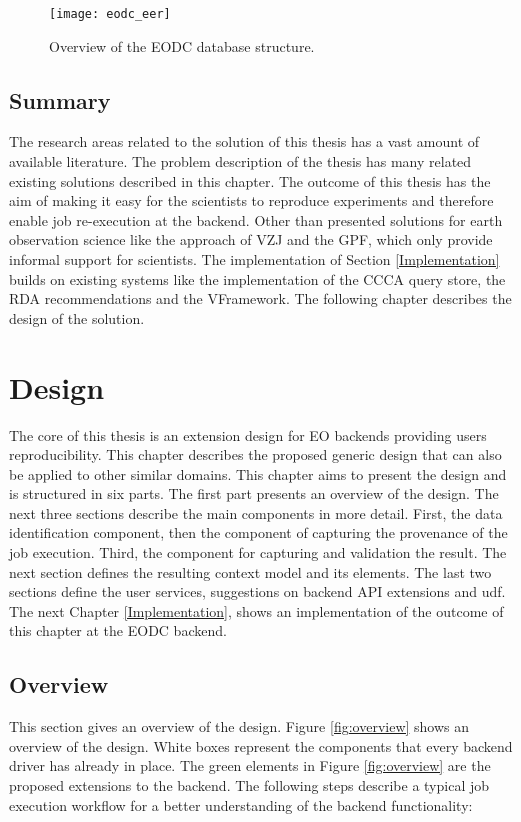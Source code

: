 \documentclass[draft,final]{vutinfth} %
\begin{document}
\begin{figure}[h]
	\centering
	\texttt{[image: eodc\_eer]}
	\caption{Overview of the EODC database structure.}
	\label{fig:eodceer} %
\end{figure}
\newpage
\section{Summary}

The research areas related to the solution of this thesis has a vast amount of available literature. The problem description of the thesis has many related existing solutions described in this chapter. The outcome of this thesis has the aim of making it easy for the scientists to reproduce experiments and therefore enable job re-execution at the backend. Other than presented solutions for earth observation science like the approach of VZJ and the GPF, which only provide informal support for scientists. The implementation of Section \ref{Implementation} builds on existing systems like the implementation of the CCCA query store, the RDA recommendations and the VFramework. The following chapter describes the design of the solution. 
 
\chapter{Design}\label{Design}


The core of this thesis is an extension design for EO backends providing users reproducibility. This chapter describes the proposed generic design that can also be applied to other similar domains. This chapter aims to present the design and is structured in six parts. The first part presents an overview of the design. The next three sections describe the main components in more detail. First,  the data identification component, then the component of capturing the provenance of the job execution. Third, the component for capturing and validation the result. The next section defines the resulting context model and its elements. The last two sections define the user services, suggestions on backend API extensions and \gls{udf}. The next Chapter \ref{Implementation}, shows an implementation of the outcome of this chapter at the EODC backend. 

\section{Overview}\label{Design:Overview}
This section gives an overview of the design. Figure \ref{fig:overview} shows an overview of the design. White boxes represent the components that every backend driver has already in place. The green elements in Figure \ref{fig:overview} are the proposed extensions to the backend. The following steps describe a typical job execution workflow for a better understanding of the backend functionality:
\end{document}
